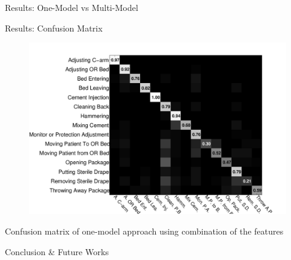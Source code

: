 \documentclass[final,hyperref={pdfpagelabels=false}]{beamer}
\begin{document}
\begin{frame}[t]
\begin{columns}[t]
\begin{column}{.465\textwidth}
\begin{block}{Results: One-Model vs Multi-Model}
\end{block}


\begin{block}{Results: Confusion Matrix}

\begin{figure}
\includegraphics[width=0.7\linewidth]{figures/combination-onemodel}
\end{figure}

\begin{center}
{\small  Confusion matrix of one-model approach using combination of the features}
\end{center}

\end{block}


\begin{block}{Conclusion \& Future Works}


\end{block}
\end{column}
\end{columns}
\end{frame}
\end{document}
